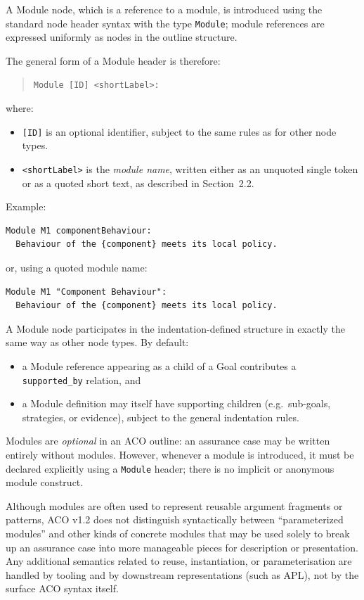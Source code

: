 \documentclass[11pt]{article}
\begin{document}
A Module node, which is a reference to a module, is introduced using the standard node header syntax with the type
\texttt{Module};
module references are expressed uniformly as nodes in the outline structure.

The general form of a Module header is therefore:
\begin{quote}
\texttt{Module [ID] \textless shortLabel\textgreater:}
\end{quote}

where:
\begin{itemize}[leftmargin=2em]
  \item \texttt{[ID]} is an optional identifier, subject to the same rules as for other node types.
  \item \texttt{\textless shortLabel\textgreater{}} is the \emph{module name}, written either as an
        unquoted single token or as a quoted short text, as described in Section~2.2.
\end{itemize}

Example:
\begin{verbatim}
Module M1 componentBehaviour:
  Behaviour of the {component} meets its local policy.
\end{verbatim}

or, using a quoted module name:
\begin{verbatim}
Module M1 "Component Behaviour":
  Behaviour of the {component} meets its local policy.
\end{verbatim}

A Module node participates in the indentation-defined structure in exactly the same way as
other node types. By default:
\begin{itemize}[leftmargin=2em]
  \item a Module reference appearing as a child of a Goal contributes a
        \texttt{supported\_by} relation, and
  \item a Module definition may itself have supporting children (e.g.\ sub-goals, strategies, or evidence),
        subject to the general indentation rules.
\end{itemize}

Modules are \emph{optional} in an ACO outline: an assurance case may be written entirely
without modules. However, whenever a module is introduced, it must be declared explicitly
using a \texttt{Module} header; there is no implicit or anonymous module construct.

Although modules are often used to represent reusable argument fragments or patterns,
ACO v1.2 does not distinguish syntactically between ``parameterized modules'' and other kinds
of concrete modules that may be used solely to break up an assurance case into more manageable pieces for description or presentation. Any additional semantics related to reuse, instantiation, or parameterisation
are handled by tooling and by downstream representations (such as APL), not by the
surface ACO syntax itself.
\end{document}

